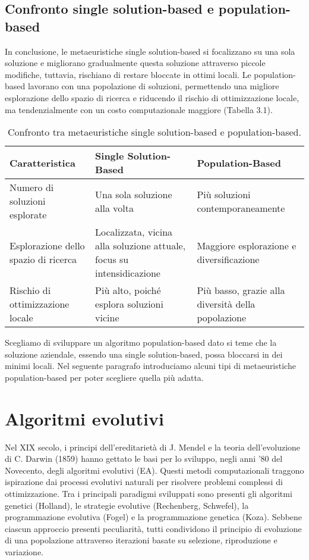 \subsection{Confronto single solution-based e population-based}

In conclusione, le metaeuristiche single solution-based si focalizzano su una sola soluzione e migliorano gradualmente questa soluzione attraverso piccole modifiche, tuttavia, rischiano di restare bloccate in ottimi locali. Le population-based lavorano con una popolazione di soluzioni, permettendo una migliore esplorazione dello spazio di ricerca e riducendo il rischio di ottimizzazione locale, ma tendenzialmente con un costo computazionale maggiore (Tabella 3.1).

\begin{table}[!ht]
    \centering
    \renewcommand{\arraystretch}{1.7}
    \begin{tabular}{|>{\raggedright\arraybackslash}p{4cm}|>{\raggedright\arraybackslash}p{4cm}|>{\raggedright\arraybackslash}p{4cm}|}
    \hline
    \textbf{Caratteristica} & \textbf{Single Solution-Based} & \textbf{Population-Based} \\ \hline
    Numero di soluzioni esplorate & Una sola soluzione alla volta & Più soluzioni contemporaneamente \\ \hline
    Esplorazione dello spazio di ricerca & Localizzata, vicina alla soluzione attuale, focus su intensidicazione & Maggiore esplorazione e diversificazione \\ \hline
    Rischio di ottimizzazione locale & Più alto, poiché esplora soluzioni vicine & Più basso, grazie alla diversità della popolazione \\ \hline
    \end{tabular}
    \caption{Confronto tra metaeuristiche single solution-based e population-based.}
    \label{tab:comparison}
\end{table}

Scegliamo di sviluppare un algoritmo population-based dato si teme che la soluzione aziendale, essendo una single solution-based, possa bloccarsi in dei minimi locali. Nel seguente paragrafo introduciamo alcuni tipi di metaeuristiche population-based per poter scegliere quella più adatta.

\section{Algoritmi evolutivi} \hypertarget{ea}{}

Nel XIX secolo, i principi dell'ereditarietà di J. Mendel e la teoria dell'evoluzione di C. Darwin (1859) hanno gettato le basi per lo sviluppo, negli anni '80 del Novecento, degli algoritmi evolutivi (EA). Questi metodi computazionali traggono ispirazione dai processi evolutivi naturali per risolvere problemi complessi di ottimizzazione. Tra i principali paradigmi sviluppati sono presenti gli algoritmi genetici (Holland), le strategie evolutive (Rechenberg, Schwefel), la programmazione evolutiva (Fogel) e la programmazione genetica (Koza). Sebbene ciascun approccio presenti peculiarità, tutti condividono il principio di evoluzione di una popolazione attraverso iterazioni basate su selezione, riproduzione e variazione. 

